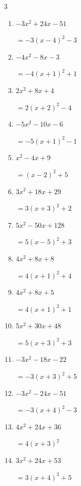 \begin{multicols}{3}
\begin{enumerate}
  \item $-3x^{2}+24x-51$

        $=-3\left( x-4\right)^{2}-3$

  \item $-4x^{2}-8x-3$

        $=-4\left( x+1\right)^{2}+1$

  \item $2x^{2}+8x+4$

        $=2\left( x+2\right)^{2}-4$

\columnbreak %

  \item $-5x^{2}-10x-6$

        $=-5\left( x+1\right)^{2}-1$

  \item $x^{2}-4x+9$

        $=\left( x-2\right)^{2}+5$

  \item $3x^{2}+18x+29$

        $=3\left( x+3\right)^{2}+2$

  \item $5x^{2}-50x+128$

        $=5\left( x-5\right)^{2}+3$

  \item $4x^{2}+8x+8$

        $=4\left( x+1\right)^{2}+4$

  \item $4x^{2}+8x+5$

        $=4\left( x+1\right)^{2}+1$

  \item $5x^{2}+30x+48$

        $=5\left( x+3\right)^{2}+3$

  \item $-3x^{2}-18x-22$

        $=-3\left( x+3\right)^{2}+5$

  \item $-3x^{2}-24x-51$

        $=-3\left( x+4\right)^{2}-3$

  \item $4x^{2}+24x+36$

        $=4\left( x+3\right)^{2}$

\columnbreak %

  \item $3x^{2}+24x+53$

        $=3\left( x+4\right)^{2}+5$


\end{enumerate}
\end{multicols}
